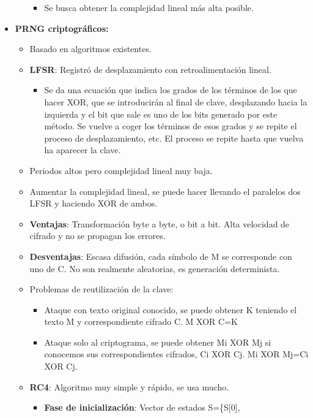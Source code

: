 \documentclass[12pt, twoside, openright]{report} %
\begin{document}
\begin{itemize}
\begin{itemize}
\begin{itemize}
			            \item Se busca obtener la complejidad lineal más alta posible.
		            \end{itemize}
	      \end{itemize}
	\item \textbf{PRNG criptográficos:}
	      \begin{itemize}
		      \item Basado en algoritmos existentes.
		      \item \textbf{LFSR}: Registró de desplazamiento con retroalimentación lineal.
		            \begin{itemize}
			            \item Se da una ecuación que indica los grados de los términos de los que hacer XOR, que se introducirán al final de clave, desplazando hacia la izquierda y el bit que sale es uno de los bits generado por este método. Se vuelve a coger los términos de esos grados y se repite el proceso de desplazamiento, etc. El proceso se repite hasta que vuelva ha aparecer la clave.
		            \end{itemize}
		      \item Periodos altos pero complejidad lineal muy baja.
		      \item Aumentar la complejidad lineal, se puede hacer llevando el paralelos dos LFSR y haciendo XOR de ambos.
		      \item \textbf{Ventajas}: Transformación byte a byte, o bit a bit. Alta velocidad de cifrado y no se propagan los errores.
		      \item \textbf{Desventajas}: Escasa difusión, cada símbolo de M se corresponde con uno de C. No son realmente aleatorias, es generación determinista.
		      \item Problemas de reutilización de la clave:
		            \begin{itemize}
			            \item Ataque con texto original conocido, se puede obtener K teniendo el texto M y correspondiente cifrado C. M XOR C=K
			            \item Ataque solo al criptograma, se puede obtener Mi XOR Mj si conocemos sus correspondientes cifrados, Ci XOR Cj. Mi XOR Mj=Ci XOR Cj.
		            \end{itemize}
		      \item \textbf{RC4}: Algoritmo muy simple y rápido, se usa mucho.
		            \begin{itemize}
			            \item \textbf{Fase de inicialización}: Vector de estados S=\{S{[}0{]},

\end{itemize}
\end{itemize}
\end{itemize}
\end{document}
